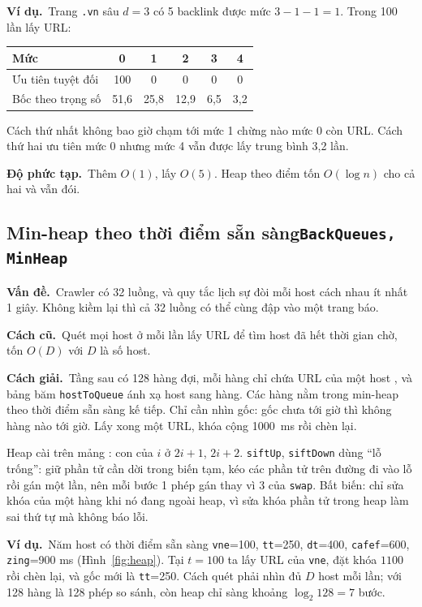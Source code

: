 \documentclass[9pt,twocolumn,a4paper]{extarticle}
\newcommand{\code}[1]{\texttt{#1}}
\newcommand{\dsa}[2]{\subsection[#1]{#1\hfill{\normalfont\footnotesize\code{#2}}}}
\newcommand{\vande}{\textcolor{linkblue}{\textbf{Vấn đề.}}~}
\newcommand{\cachgiai}{\textcolor{linkblue}{\textbf{Cách giải.}}~}
\newcommand{\dpt}{\textcolor{linkblue}{\textbf{Độ phức tạp.}}~}
\newcommand{\cu}{\textcolor{linkblue}{\textbf{Cách cũ.}}~}
\newcommand{\vidu}{\textcolor{linkblue}{\textbf{Ví dụ.}}~}
\begin{document}
\vidu Trang \code{.vn} sâu $d=3$ có 5 backlink được mức $3-1-1=1$. Trong 100 lần lấy URL:
\begin{center}\footnotesize
\begin{tabular}{@{}lccccc@{}}
\toprule
Mức & 0 & 1 & 2 & 3 & 4 \\
\midrule
Ưu tiên tuyệt đối & 100 & 0 & 0 & 0 & 0 \\
Bốc theo trọng số & 51,6 & 25,8 & 12,9 & 6,5 & 3,2 \\
\bottomrule
\end{tabular}
\end{center}
Cách thứ nhất không bao giờ chạm tới mức 1 chừng nào mức 0 còn URL. Cách thứ hai ưu tiên mức 0 nhưng mức 4 vẫn được lấy trung bình 3,2 lần.

\dpt Thêm $O(1)$, lấy $O(5)$. Heap theo điểm tốn $O(\log n)$ cho cả hai và vẫn đói.

\dsa{Min-heap theo thời điểm sẵn sàng}{BackQueues, MinHeap}
\vande Crawler có 32 luồng, và quy tắc lịch sự đòi mỗi host cách nhau ít nhất 1 giây. Không kiềm lại thì cả 32 luồng có thể cùng đập vào một trang báo.

\cu Quét mọi host ở mỗi lần lấy URL để tìm host đã hết thời gian chờ, tốn $O(D)$ với $D$ là số host.

\cachgiai Tầng sau có 128 hàng đợi, mỗi hàng chỉ chứa URL của một host \cite{heydon1999mercator}, và bảng băm \code{hostToQueue} ánh xạ host sang hàng. Các hàng nằm trong min-heap theo thời điểm sẵn sàng kế tiếp. Chỉ cần nhìn gốc: gốc chưa tới giờ thì không hàng nào tới giờ. Lấy xong một URL, khóa cộng 1000~ms rồi chèn lại.

Heap cài trên mảng \cite{cormen2009}: con của $i$ ở $2i+1$, $2i+2$. \code{siftUp}, \code{siftDown} dùng ``lỗ trống'': giữ phần tử cần dời trong biến tạm, kéo các phần tử trên đường đi vào lỗ rồi gán một lần, nên mỗi bước 1 phép gán thay vì 3 của \code{swap}. Bất biến: chỉ sửa khóa của một hàng khi nó đang ngoài heap, vì sửa khóa phần tử trong heap làm sai thứ tự mà không báo lỗi.

\vidu Năm host có thời điểm sẵn sàng \code{vne}=100, \code{tt}=250, \code{dt}=400, \code{cafef}=600, \code{zing}=900 ms (Hình~\ref{fig:heap}). Tại $t=100$ ta lấy URL của \code{vne}, đặt khóa $1100$ rồi chèn lại, và gốc mới là \code{tt}=250. Cách quét phải nhìn đủ $D$ host mỗi lần; với 128 hàng là 128 phép so sánh, còn heap chỉ sàng khoảng $\log_2 128=7$ bước.
\end{document}
